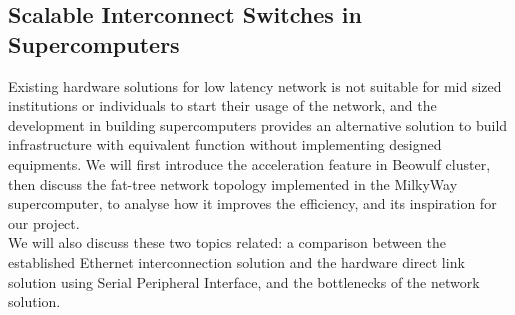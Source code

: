 \documentclass[11pt,openright,a4paper]{report}
\begin{document}
\subsection{Scalable Interconnect Switches in Supercomputers}
Existing hardware solutions for low latency network is not suitable for mid sized institutions or individuals to start their usage of the network, and the development in building supercomputers provides an alternative solution to build infrastructure with equivalent function without implementing designed equipments. We will first introduce the acceleration feature in Beowulf cluster, then discuss the fat-tree network topology implemented in the MilkyWay supercomputer, to analyse how it improves the efficiency, and its inspiration for our project.\\
We will also discuss these two topics related: a comparison between the established Ethernet interconnection solution and the hardware direct link solution using Serial Peripheral Interface, and the bottlenecks of the network solution.
\end{document}
